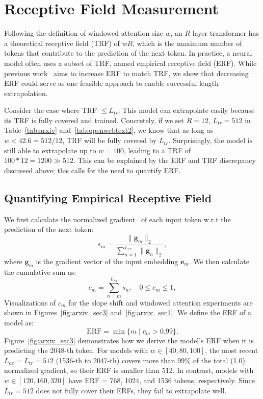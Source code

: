 \documentclass[11pt]{article}
\theoremstyle{plain}
\begin{document}
\section{Receptive Field Measurement}
\label{sec:receptive}
Following the definition of windowed attention size $w$, an $R$ layer transformer has a theoretical receptive field (TRF) of $wR$, which is the maximum number of tokens that contribute to the prediction of the next token. In practice, a neural model often uses a subset of TRF, named empirical receptive field (ERF). While previous work~\cite{receptive, deformable,araujo2019computing,raghu2021do,dosovitskiy2021an,beltagy2020longformer} aims to increase ERF to match TRF, we show that decreasing ERF could serve as one feasible approach to enable successful length extrapolation.

Consider the case where TRF $\leq L_{tr}$: This model can extrapolate easily because its TRF is fully covered and trained. Concretely, if we set $R=12$, $L_{tr}=512$ in Table~\ref{tab:arxiv} and~\ref{tab:openwebtext2}, we know that as long as $w<42.6=512/12$, TRF will be fully covered by $L_{tr}$. 
Surprisingly, the model is still able to extrapolate up to $w=100$, leading to a TRF of $100*12=1200 \gg 512$. This can be explained by the ERF and TRF discrepancy discussed above; this calls for the need to quantify ERF.

\subsection{Quantifying Empirical Receptive Field}
\label{sec:quant_cm}
We first calculate the normalized gradient~\cite{receptive} of each input token w.r.t the prediction of the next token:
\begin{equation*}
    s_m=\frac{\|\bm g_m\|_2}{\sum_{n=1}^{L_{ex}} \|\bm g_n\|_2},
\end{equation*}
where $\bm g_m$ is the gradient vector of the input embedding $\bm e_m$.
We then calculate the cumulative sum as:
\begin{equation*}
    c_m=\sum_{n=m}^{L_{ex}} s_n,\quad 0 \leq c_m \leq 1,
\end{equation*}
Visualizations of $c_m$ for the slope shift and windowed attention experiments are shown in Figures~\ref{fig:arxiv_sec3} and~\ref{fig:arxiv_sec1}.
We define the ERF of a model as: $$\text{ERF} = \min \{m \mid c_m > 0.99\}.$$ Figure~\ref{fig:arxiv_sec3} demonstrates how we derive the model's ERF when it is predicting the 2048-th token. For models with $w\in [40, 80, 100]$, the most recent $L_{ex}=L_{tr}=512$ (1536-th to 2047-th) covers more than 99\% of the total (1.0) normalized gradient, so their ERF is smaller than 512. In contrast, models with $w\in [120, 160, 320]$ have ERF = 768, 1024, and 1536 tokens, respectively. Since $L_{tr}=512$ does not fully cover their ERFs, they fail to extrapolate well.
\end{document}
